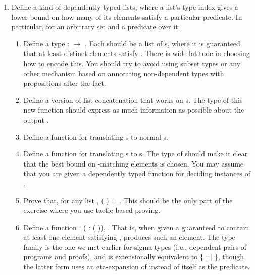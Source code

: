 \documentclass[12pt]{report}
\begin{document}
 \begin{enumerate}


\item Define a kind of dependently typed lists, where a list's type index gives a lower bound on how many of its elements satisfy a particular predicate.  In particular, for an arbitrary set  and a predicate  over it:
\begin{enumerate}
  \item Define a type  :  \ensuremath{\rightarrow} .  Each   should be a list of s, where it is guaranteed that at least  distinct elements satisfy .  There is wide latitude in choosing how to encode this.  You should try to avoid using subset types or any other mechanism based on annotating non-dependent types with propositions after-the-fact.
  \item Define a version of list concatenation that works on s.  The type of this new function should express as much information as possible about the output .
  \item Define a function  for translating s to normal s.
  \item Define a function  for translating s to s.  The type of  should make it clear that the best bound on -matching elements is chosen.  You may assume that you are given a dependently typed function for deciding instances of .
  \item Prove that, for any list ,  ( ) = .  This should be the only part of the exercise where you use tactic-based proving.
  \item Define a function  : \coqdockw{\ensuremath{\forall}}  ( :  ( )),  .  That is, when given a  guaranteed to contain at least one element satisfying ,  produces such an element.  The type family  is the one we met earlier for sigma types (i.e., dependent pairs of programs and proofs), and   is extensionally equivalent to \{ :  \ensuremath{|}  \}, though the latter form uses an eta-expansion of  instead of  itself as the predicate.
\end{enumerate} 


\end{enumerate} 
\end{document}
